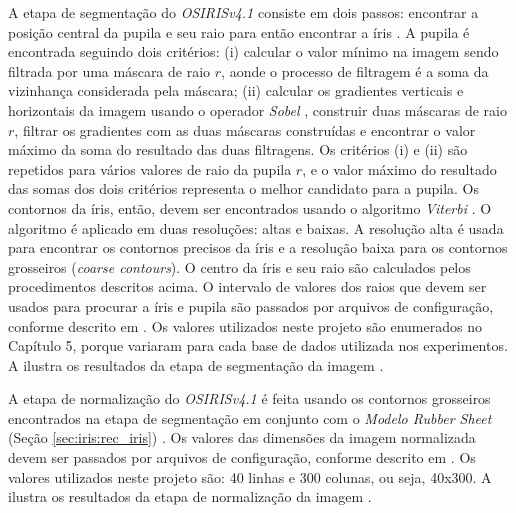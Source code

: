 
\par A etapa de segmentação do \textit{OSIRISv4.1} consiste em dois passos: encontrar a posição central da pupila e seu raio para então encontrar a íris \cite{osirisv41_doc}. A pupila é encontrada seguindo dois critérios: (i) calcular o valor mínimo na imagem sendo filtrada por uma máscara de raio $r$, aonde o processo de filtragem é a soma da vizinhança considerada pela máscara; (ii) calcular os gradientes verticais e horizontais da imagem usando o operador \textit{Sobel} \cite{kanopoulos1988}, construir duas máscaras de raio $r$, filtrar os gradientes com as duas máscaras construídas e encontrar o valor máximo da soma do resultado das duas filtragens. Os critérios (i) e (ii)  são repetidos para vários valores de raio da pupila $r$, e o valor máximo do resultado das somas dos dois critérios representa o melhor candidato para a pupila. Os contornos da íris, então, devem ser encontrados usando o algoritmo \textit{Viterbi} \cite{sutra2012}. O algoritmo é aplicado em duas resoluções: altas e baixas. A resolução alta é usada para encontrar os contornos precisos da íris e a resolução baixa para os contornos grosseiros (\textit{coarse contours}). O centro da íris e seu raio são calculados pelos procedimentos descritos acima. O intervalo de valores dos raios que devem ser usados para procurar a íris e pupila são passados por arquivos de configuração, conforme descrito em \cite{osirisv41_doc}. Os valores utilizados neste projeto são enumerados no Capítulo 5, porque variaram para cada base de dados utilizada nos experimentos. A  ilustra os resultados da etapa de segmentação da imagem .


\par A etapa de normalização do \textit{OSIRISv4.1} é feita usando os contornos grosseiros encontrados na etapa de segmentação em conjunto com o \textit{Modelo Rubber Sheet} (Seção \ref{sec:iris:rec_iris}) \cite{osirisv41_doc}. Os valores das dimensões da imagem normalizada devem ser passados por arquivos de configuração, conforme descrito em \cite{osirisv41_doc}. Os valores utilizados neste projeto são: 40 linhas e 300 colunas, ou seja, 40x300. A  ilustra os resultados da etapa de normalização da imagem .

